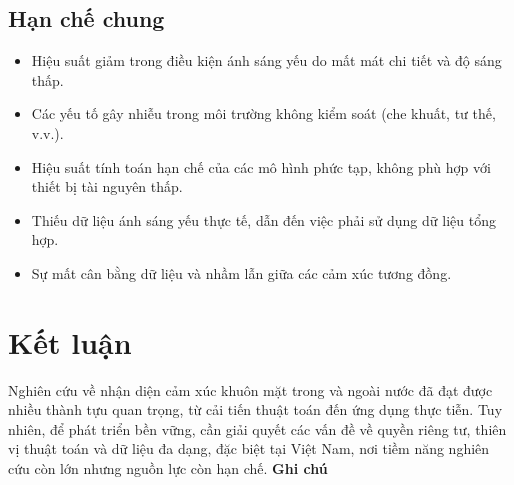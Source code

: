\subsection*{Hạn chế chung}
\begin{itemize}
    \item  Hiệu suất giảm trong điều kiện ánh sáng yếu do mất mát chi tiết và độ sáng thấp.
    \item  Các yếu tố gây nhiễu trong môi trường không kiểm soát (che khuất, tư thế, v.v.).
    \item  Hiệu suất tính toán hạn chế của các mô hình phức tạp, không phù hợp với thiết bị tài nguyên thấp.
    \item  Thiếu dữ liệu ánh sáng yếu thực tế, dẫn đến việc phải sử dụng dữ liệu tổng hợp.
    \item  Sự mất cân bằng dữ liệu và nhầm lẫn giữa các cảm xúc tương đồng.
  
\end{itemize}

\section*{Kết luận}
Nghiên cứu về nhận diện cảm xúc khuôn mặt trong và ngoài nước đã đạt được nhiều thành tựu quan trọng, từ cải tiến thuật toán đến ứng dụng thực tiễn. Tuy nhiên, để phát triển bền vững, cần giải quyết các vấn đề về quyền riêng tư, thiên vị thuật toán và dữ liệu đa dạng, đặc biệt tại Việt Nam, nơi tiềm năng nghiên cứu còn lớn nhưng nguồn lực còn hạn chế.
\textbf{Ghi chú}